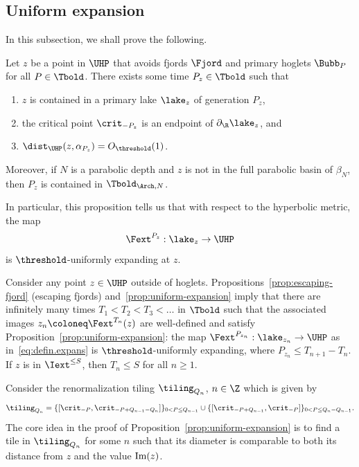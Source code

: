 \documentclass{amsart}
\begin{document}
\subsection{Uniform expansion}

In this subsection, we shall prove the following.

\begin{proposition}
\label{prop:uniform-expansion}
    Let $z$ be a point in $\UHP$ that avoids fjords $\Fjord$ and primary hoglets $\Bubb_P$ for all $P \in \Tbold$. 
    There exists some time $P_z\in \Tbold$ such that
    \begin{enumerate}
        \item $z$ is contained in a primary lake $\lake_z$ of generation $P_z$,
        \item the critical point $\crit_{-P_z}$ is an endpoint of $\partial_{\R} \lake_z$, and
        \item $\dist_{\UHP}(z, \alpha_{P_z}) = O_{\threshold}(1)$.
    \end{enumerate}
    Moreover, if $N$ is a parabolic depth and $z$ is not in the full parabolic basin of $\beta_N$, then $P_z$ is contained in $\Tbold_{\Arch,N}$.
\end{proposition}

In particular, this proposition tells us that with respect to the hyperbolic metric, the map 
\begin{equation}
    \label{eq:defin.expans}
\Fext^{P_z}: \lake_z \to \UHP
\end{equation}
is $\threshold$-uniformly expanding at $z$.

\begin{remark}
    \label{rem:expanding.iterates} Consider any point $z\in \UHP$ outside of hoglets. Propositions~\ref{prop:escaping-fjord} (escaping fjords) and~\ref{prop:uniform-expansion} imply that there are infinitely many times $T_1<T_2<T_3<\dots$ in $\Tbold$ such that the associated images $z_n\coloneq \Fext^{T_n}(z)$ are well-defined and satisfy Proposition~\ref{prop:uniform-expansion}: the map $\Fext^{P_{z_n}}: \lake_{z_n} \to \UHP$ as in~\eqref{eq:defin.expans} is $\threshold$-uniformly expanding, where $P_{z_n}\le T_{n+1}-T_{n}$. If $z$ is in $\Iext^{\leq S}$, then $T_n\leq S$ for all $n \geq 1$.
\end{remark}

Consider the renormalization tiling $\tiling_{Q_n}$, $n \in \Z$ which is given by
\[
    \tiling_{Q_n} = 
    \{[\crit_{-P}, \crit_{-P+Q_{n-1}-Q_n} ]\}_{0<P\leq Q_{n-1}} 
    \cup 
    \{[\crit_{-P+Q_{n-1}},\crit_{-P}]\}_{0<P\leq Q_{n}-Q_{n-1}}.
\]
The core idea in the proof of Proposition~\ref{prop:uniform-expansion} is to find a tile in $\tiling_{Q_n}$ for some $n$ such that its diameter is comparable to both its distance from $z$ and the value $\textnormal{Im}(z)$.
\end{document}
